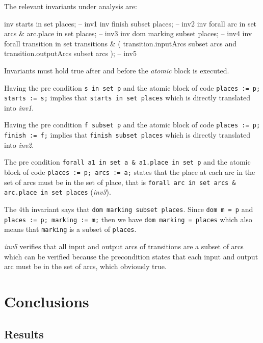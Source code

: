 \documentclass[a4paper]{article}
\begin{document}
The relevant invariants under analysis are:

\begin{vdmpp}
    inv starts in set places; -- inv1
    inv finish subset places; -- inv2
    inv forall arc in set arcs & arc.place in set places; -- inv3
    inv dom marking subset places; -- inv4
    inv forall transition in set transitions & (
     transition.inputArcs subset arcs and
     transition.outputArcs subset arcs
    ); -- inv5
\end{vdmpp}

Invariants must hold true after and before the \textit{atomic} block is executed.

Having the pre condition \texttt{s in set p} and the atomic block of code \texttt{places := p; starts := s;} implies that \texttt{starts in set places} which is directly translated into \textit{inv1}.

Having the pre condition \texttt{f subset p} and the atomic block of code \texttt{places := p; finish := f;} implies that \texttt{finish subset places} which is directly translated into \textit{inv2}.

The pre condition \texttt{forall a1 in set a \& a1.place in set p} and the atomic block of code \texttt{places := p; arcs := a;} states that the place at each arc in the set of arcs must be in the set of place, that is \texttt{forall arc in set arcs \& arc.place in set places} (\textit{inv3}).

The 4th invariant says that \texttt{dom marking subset places}. Since \texttt{dom m = p} and \texttt{places := p; marking := m;} then we have \texttt{dom marking = places} which also means that \texttt{marking} is a subset of \texttt{places}.

\textit{inv5} verifies that all input and output arcs of transitions are a subset of arcs which can be verified because the precondition states that each input and output arc must be in the set of arcs, which obviously true.

\newpage

\section {Conclusions}


\subsection {Results}
\end{document}
